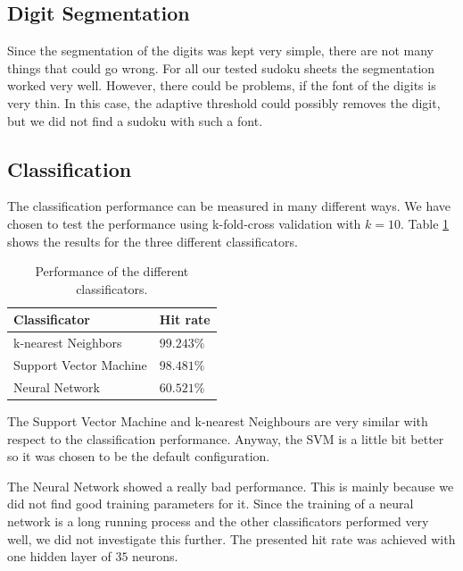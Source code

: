 \documentclass[
a4paper,     %
12pt         %
]{scrartcl}  %
\begin{document}
\subsection{Digit Segmentation}

\label{sec:class_perf}
 
Since the segmentation of the digits was kept very simple, there are not many things that could go
wrong. For all our tested sudoku sheets the segmentation worked very well. However, there could
be problems, if the font of the digits is very thin. In this case, the adaptive threshold could
possibly removes the digit, but we did not find a sudoku with such a font.

\subsection{Classification}

The classification performance can be measured in many different ways. We have chosen to test the
performance using k-fold-cross validation with $k=10$. Table \ref{tab:class_perf} shows the results
for the three different classificators.

\begin{table}
    \centering
    \begin{tabular}{|l|l|}
    \hline
    \textbf{Classificator}          & \textbf{Hit rate}   \\ \hline
    k-nearest Neighbors    & $ 99.243\%$ \\ \hline
    Support Vector Machine & $ 98.481\%$    \\ \hline
    Neural Network         & $ 60.521\%$    \\ \hline
    \end{tabular}
    \caption{Performance of the different classificators.}
    \label{tab:class_perf}
\end{table}

The Support Vector Machine and k-nearest Neighbours are very similar with respect to the classification
performance. Anyway, the SVM is a little bit better so it was chosen to be the default configuration.

The Neural Network showed a really bad performance. This is mainly because we did not find good training
parameters for it. Since the training of a neural network is a long running process and the other 
classificators performed very well, we did not investigate this further. The presented hit rate was
achieved with one hidden layer of $35$ neurons.
\end{document}

